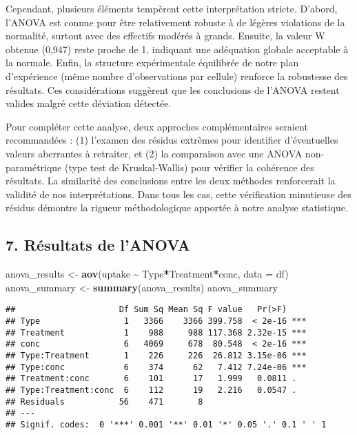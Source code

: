 \documentclass[
]{article}
\newenvironment{Shaded}{\begin{snugshade}}{\end{snugshade}}
\newcommand{\AttributeTok}[1]{\textcolor[rgb]{0.13,0.29,0.53}{#1}}
\newcommand{\FunctionTok}[1]{\textcolor[rgb]{0.13,0.29,0.53}{\textbf{#1}}}
\newcommand{\NormalTok}[1]{#1}
\newcommand{\OtherTok}[1]{\textcolor[rgb]{0.56,0.35,0.01}{#1}}
\newcommand{\SpecialCharTok}[1]{\textcolor[rgb]{0.81,0.36,0.00}{\textbf{#1}}}
\begin{document}
Cependant, plusieurs éléments tempèrent cette interprétation stricte.
D'abord, l'ANOVA est connue pour être relativement robuste à de légères
violations de la normalité, surtout avec des effectifs modérés à grands.
Ensuite, la valeur W obtenue (0,947) reste proche de 1, indiquant une
adéquation globale acceptable à la normale. Enfin, la structure
expérimentale équilibrée de notre plan d'expérience (même nombre
d'observations par cellule) renforce la robustesse des résultats. Ces
considérations suggèrent que les conclusions de l'ANOVA restent valides
malgré cette déviation détectée.

Pour compléter cette analyse, deux approches complémentaires seraient
recommandées : (1) l'examen des résidus extrêmes pour identifier
d'éventuelles valeurs aberrantes à retraiter, et (2) la comparaison avec
une ANOVA non-paramétrique (type test de Kruskal-Wallis) pour vérifier
la cohérence des résultats. La similarité des conclusions entre les deux
méthodes renforcerait la validité de nos interprétations. Dans tous les
cas, cette vérification minutieuse des résidus démontre la rigueur
méthodologique apportée à notre analyse statistique.

\subsection{7. Résultats de l'ANOVA}\label{ruxe9sultats-de-lanova}

\begin{Shaded}
\begin{Highlighting}[]
\NormalTok{anova\_results }\OtherTok{\textless{}{-}} \FunctionTok{aov}\NormalTok{(uptake }\SpecialCharTok{\textasciitilde{}}\NormalTok{ Type}\SpecialCharTok{*}\NormalTok{Treatment}\SpecialCharTok{*}\NormalTok{conc, }\AttributeTok{data =}\NormalTok{ df)}
\NormalTok{anova\_summary }\OtherTok{\textless{}{-}} \FunctionTok{summary}\NormalTok{(anova\_results)}
\NormalTok{anova\_summary}
\end{Highlighting}
\end{Shaded}

\begin{verbatim}
##                     Df Sum Sq Mean Sq F value   Pr(>F)    
## Type                 1   3366    3366 399.758  < 2e-16 ***
## Treatment            1    988     988 117.368 2.32e-15 ***
## conc                 6   4069     678  80.548  < 2e-16 ***
## Type:Treatment       1    226     226  26.812 3.15e-06 ***
## Type:conc            6    374      62   7.412 7.24e-06 ***
## Treatment:conc       6    101      17   1.999   0.0811 .  
## Type:Treatment:conc  6    112      19   2.216   0.0547 .  
## Residuals           56    471       8                     
## ---
## Signif. codes:  0 '***' 0.001 '**' 0.01 '*' 0.05 '.' 0.1 ' ' 1
\end{verbatim}
\end{document}
